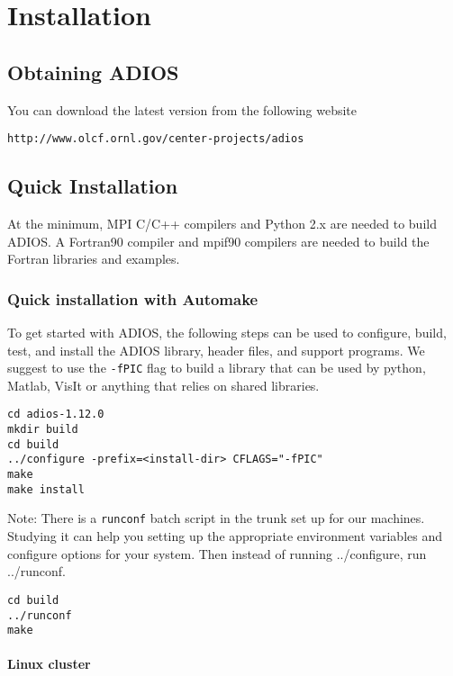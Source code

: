 \chapter{Installation}

\section{Obtaining ADIOS}

You can download the latest version from the following website

\begin{lstlisting}[language={}]
http://www.olcf.ornl.gov/center-projects/adios
\end{lstlisting}


\section{Quick Installation}
At the minimum, MPI C/C++ compilers and Python 2.x are needed to build ADIOS. 
A Fortran90 compiler and mpif90 compilers are needed to build the Fortran libraries and examples.

\subsection{Quick installation with Automake}

To get started with ADIOS, the following steps can be used to configure, build,
test, and install the ADIOS library, header files, and support programs. We suggest to use the \verb+-fPIC+ flag to build a library that can be used by python, Matlab, VisIt or anything that relies on shared libraries.

\begin{lstlisting}
cd adios-1.12.0
mkdir build
cd build
../configure -prefix=<install-dir> CFLAGS="-fPIC"
make
make install
\end{lstlisting}

Note: There is a  \verb+runconf+ batch script in the trunk set up for our machines. Studying
it can help you setting up the appropriate environment variables and configure
options for your system. Then instead of running ../configure, run ../runconf. 
\begin{lstlisting}
cd build
../runconf
make
\end{lstlisting}


\subsubsection{Linux cluster}

